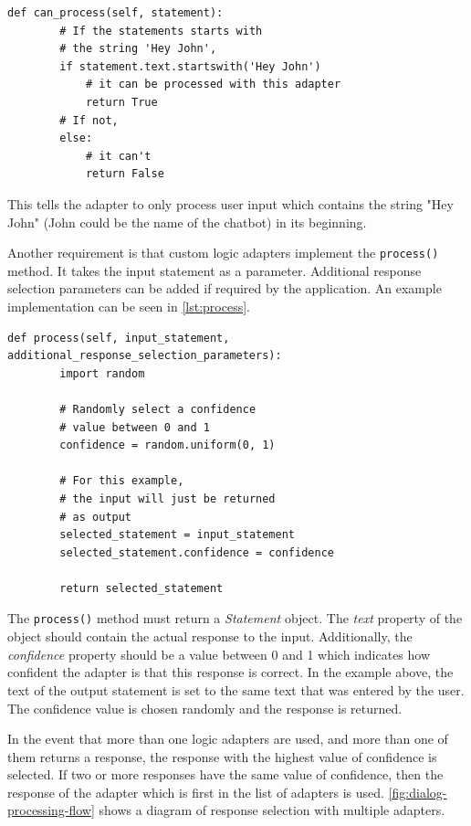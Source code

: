 \documentclass[12pt,a4paper]{article}
\begin{document}
\begin{lstlisting}[caption={\small{\textit{Example implementation of the can\_process method. Adapted from \cite{Chatterbot:online}}}}, label={lst:canprocess}]
    def can_process(self, statement):
        # If the statements starts with
        # the string 'Hey John',
        if statement.text.startswith('Hey John')
            # it can be processed with this adapter
            return True
        # If not,
        else:
            # it can't
            return False
\end{lstlisting}

This tells the adapter to only process user input which contains the string "Hey John" (John could be the name of the chatbot) in its beginning.

Another requirement is that custom logic adapters implement the \texttt{process()} method. It takes the input statement as a parameter. Additional response selection parameters can be added if required by the application. An example implementation can be seen in \cref{lst:process}.

\begin{lstlisting}[caption={\small{\textit{Example implementation of the process() method. Adapted from \cite{Chatterbot:online}}}}, label={lst:process}]
    def process(self, input_statement, additional_response_selection_parameters):
        import random

        # Randomly select a confidence
        # value between 0 and 1
        confidence = random.uniform(0, 1)

        # For this example,
        # the input will just be returned
        # as output
        selected_statement = input_statement
        selected_statement.confidence = confidence

        return selected_statement
\end{lstlisting}

The \texttt{process()} method must return a \textit{Statement} object. The \textit{text} property of the object should contain the actual response to the input. Additionally, the \textit{confidence} property should be a value between 0 and 1 which indicates how confident the adapter is that this response is correct. In the example above, the text of the output statement is set to the same text that was entered by the user. The confidence value is chosen randomly and the response is returned.

In the event that more than one logic adapters are used, and more than one of them returns a response, the response with the highest value of confidence is selected. If two or more responses have the same value of confidence, then the response of the adapter which is first in the list of adapters is used. \cref{fig:dialog-processing-flow} shows a diagram of response selection with multiple adapters.
\end{document}
